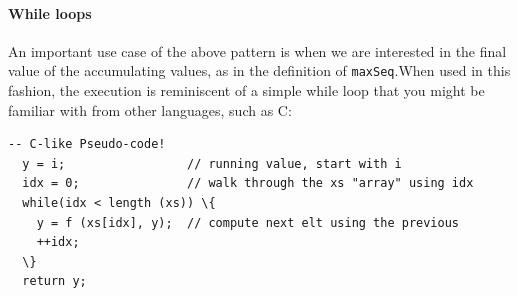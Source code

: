 \paragraph*{While loops} An important use case of the above pattern is
when we are interested in the final value of the accumulating values,
as in the definition of {\tt maxSeq}.\indRIndex\indWhileLoop When used
in this fashion, the execution is reminiscent of a simple while loop
that you might be familiar with from other languages, such as C:
\begin{Verbatim}[commandchars=\\\{\}, codes={\catcode`$=3\catcode`^=7\catcode`_=8}]
  -- C-like Pseudo-code!
  y = i;                 // running value, start with i
  idx = 0;               // walk through the xs "array" using idx
  while(idx < length (xs)) \{
    y = f (xs[idx], y);  // compute next elt using the previous
    ++idx;
  \}
  return y;
\end{Verbatim}

